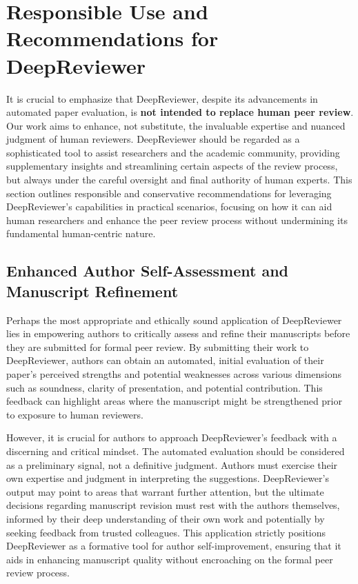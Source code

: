 \documentclass{article}
\begin{document}



\appendix


\section{Responsible Use and Recommendations for DeepReviewer}

It is crucial to emphasize that DeepReviewer, despite its advancements in automated paper evaluation, is \textbf{not intended to replace human peer review}. Our work aims to enhance, not substitute, the invaluable expertise and nuanced judgment of human reviewers. DeepReviewer should be regarded as a sophisticated tool to assist researchers and the academic community, providing supplementary insights and streamlining certain aspects of the review process, but always under the careful oversight and final authority of human experts. This section outlines responsible and conservative recommendations for leveraging DeepReviewer's capabilities in practical scenarios, focusing on how it can aid human researchers and enhance the peer review process without undermining its fundamental human-centric nature.

\subsection{Enhanced Author Self-Assessment and Manuscript Refinement}

Perhaps the most appropriate and ethically sound application of DeepReviewer lies in empowering authors to critically assess and refine their manuscripts before they are submitted for formal peer review. By submitting their work to DeepReviewer, authors can obtain an automated, initial evaluation of their paper’s perceived strengths and potential weaknesses across various dimensions such as soundness, clarity of presentation, and potential contribution. This feedback can highlight areas where the manuscript might be strengthened prior to exposure to human reviewers.

However, it is crucial for authors to approach DeepReviewer’s feedback with a discerning and critical mindset. The automated evaluation should be considered as a preliminary signal, not a definitive judgment. Authors must exercise their own expertise and judgment in interpreting the suggestions. DeepReviewer’s output may point to areas that warrant further attention, but the ultimate decisions regarding manuscript revision must rest with the authors themselves, informed by their deep understanding of their own work and potentially by seeking feedback from trusted colleagues. This application strictly positions DeepReviewer as a formative tool for author self-improvement, ensuring that it aids in enhancing manuscript quality without encroaching on the formal peer review process.
\end{document}
